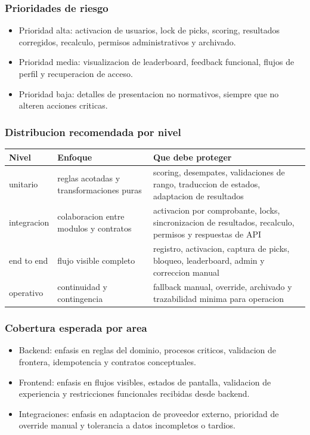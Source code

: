 \subsubsection{Prioridades de riesgo}

\begin{itemize}
  \item Prioridad alta: activacion de usuarios, lock de picks, scoring, resultados corregidos, recalculo, permisos administrativos y archivado.
  \item Prioridad media: visualizacion de leaderboard, feedback funcional, flujos de perfil y recuperacion de acceso.
  \item Prioridad baja: detalles de presentacion no normativos, siempre que no alteren acciones criticas.
\end{itemize}

\subsubsection{Distribucion recomendada por nivel}

\begin{longtable}{p{}p{}p{}}
\toprule
\textbf{Nivel} & \textbf{Enfoque} & \textbf{Que debe proteger} \\
\midrule
unitario & reglas acotadas y transformaciones puras & scoring, desempates, validaciones de rango, traduccion de estados, adaptacion de resultados \\
integracion & colaboracion entre modulos y contratos & activacion por comprobante, locks, sincronizacion de resultados, recalculo, permisos y respuestas de API \\
end to end & flujo visible completo & registro, activacion, captura de picks, bloqueo, leaderboard, admin y correccion manual \\
operativo & continuidad y contingencia & fallback manual, override, archivado y trazabilidad minima para operacion \\
\bottomrule
\end{longtable}

\subsubsection{Cobertura esperada por area}

\begin{itemize}
  \item Backend: enfasis en reglas del dominio, procesos criticos, validacion de frontera, idempotencia y contratos conceptuales.
  \item Frontend: enfasis en flujos visibles, estados de pantalla, validacion de experiencia y restricciones funcionales recibidas desde backend.
  \item Integraciones: enfasis en adaptacion de proveedor externo, prioridad de override manual y tolerancia a datos incompletos o tardios.
\end{itemize}

